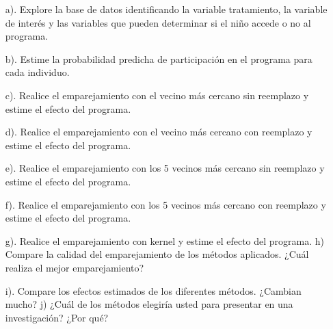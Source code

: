 \documentclass[12pt]{article}
\begin{document}
\begin{enumerate}
\item [a).] Explore la base de datos identificando la variable tratamiento, la variable de interés y las variables que pueden determinar si el niño accede o no al programa. 

\item [b).] Estime la probabilidad predicha de participación en el programa para cada individuo. 

\item [c).] Realice el emparejamiento con el vecino más cercano sin reemplazo y estime el efecto del programa. 

\item [d).] Realice el emparejamiento con el vecino más cercano con reemplazo y estime el efecto del programa. 

\item [e).] Realice el emparejamiento con los 5 vecinos más cercano sin reemplazo y estime el efecto del programa. 

\item [f).] Realice el emparejamiento con los 5 vecinos más cercano con reemplazo y estime el efecto del programa. 

\item [g).] Realice el emparejamiento con kernel y estime el efecto del programa. h) Compare la calidad del emparejamiento de los métodos aplicados. ¿Cuál realiza el mejor emparejamiento? 

\item [i).] Compare los efectos estimados de los diferentes métodos. ¿Cambian mucho? j) ¿Cuál de los métodos elegiría usted para presentar en una investigación? ¿Por qué? 
\end{enumerate}







\end{document}
